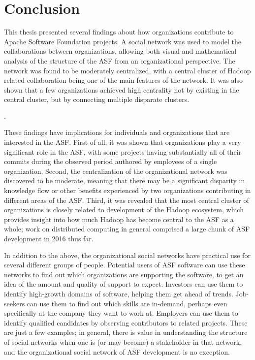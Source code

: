 \chapter{Conclusion}
This thesis presented several findings about how organizations contribute to Apache Software Foundation projects. A social network was used to model the collaborations between organizations, allowing both visual and mathematical analysis of the structure of the ASF from an organizational perspective. The network was found to be moderately centralized, with a central cluster of Hadoop related collaboration being one of the main features of the network. It was also shown that a few organizations achieved high centrality not by existing in the central cluster, but by connecting multiple disparate clusters.


. 

These findings have implications for individuals and organizations that are interested in the ASF. First of all, it was shown that organizations play a very significant role in the ASF, with some projects having substantially all of their commits during the observed period authored by employees of a single organization. Second, the centralization of the organizational network was discovered to be moderate, meaning that there may be a significant disparity in knowledge flow or other benefits experienced by two organizations contributing in different areas of the ASF. Third, it was revealed that the most central cluster of organizations is closely related to development of the Hadoop ecosystem, which provides insight into how much Hadoop has become central to the ASF as a whole; work on distributed computing in general comprised a large chunk of ASF development in 2016 thus far.

In addition to the above, the organizational social networks have practical use for several different groups of people. Potential users of ASF software can use these networks to find out which organizations are supporting the software, to get an idea of the amount and quality of support to expect. Investors can use them to identify high-growth domains of software, helping them get ahead of trends. Job-seekers can use them to find out which skills are in-demand, perhaps even specifically at the company they want to work at. Employers can use them to identify qualified candidates by observing contributors to related projects. These are just a few examples; in general, there is value in understanding the structure of social networks when one is (or may become) a stakeholder in that network, and the organizational social network of ASF development is no exception.

